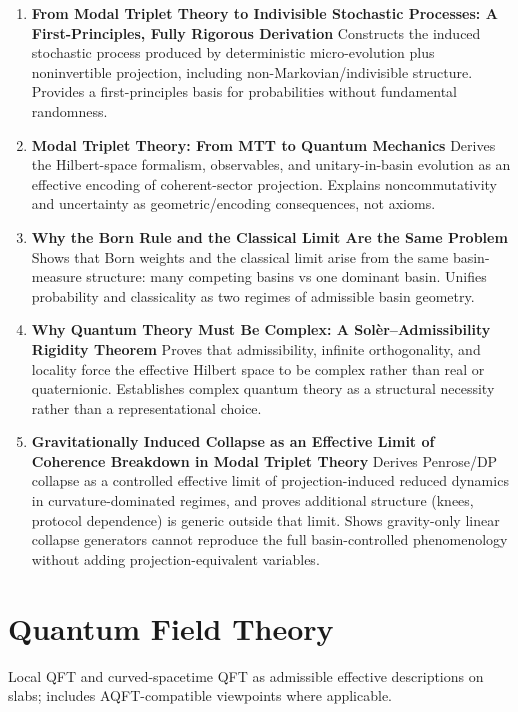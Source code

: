 \documentclass[11pt]{article}
\begin{document}
\begin{enumerate}[leftmargin=*]
\item \textbf{From Modal Triplet Theory to Indivisible Stochastic Processes: A First-Principles, Fully Rigorous Derivation} Constructs the induced stochastic process produced by deterministic micro-evolution plus noninvertible projection, including non-Markovian/indivisible structure. Provides a first-principles basis for probabilities without fundamental randomness.
\item \textbf{Modal Triplet Theory: From MTT to Quantum Mechanics} Derives the Hilbert-space formalism, observables, and unitary-in-basin evolution as an effective encoding of coherent-sector projection. Explains noncommutativity and uncertainty as geometric/encoding consequences, not axioms.
\item \textbf{Why the Born Rule and the Classical Limit Are the Same Problem} Shows that Born weights and the classical limit arise from the same basin-measure structure: many competing basins vs one dominant basin. Unifies probability and classicality as two regimes of admissible basin geometry.
\item \textbf{Why Quantum Theory Must Be Complex: A Sol\`er--Admissibility Rigidity Theorem}
Proves that admissibility, infinite orthogonality, and locality force the effective Hilbert space to be complex rather than real or quaternionic. Establishes complex quantum theory as a structural necessity rather than a representational choice.
\item \textbf{Gravitationally Induced Collapse as an Effective Limit of Coherence Breakdown in Modal Triplet Theory} Derives Penrose/DP collapse as a controlled effective limit of projection-induced reduced dynamics in curvature-dominated regimes, and proves additional structure (knees, protocol dependence) is generic outside that limit. Shows gravity-only linear collapse generators cannot reproduce the full basin-controlled phenomenology without adding projection-equivalent variables.
\end{enumerate}

\section{Quantum Field Theory}
Local QFT and curved-spacetime QFT as admissible effective descriptions on slabs; includes AQFT-compatible viewpoints where applicable.
\end{document}
